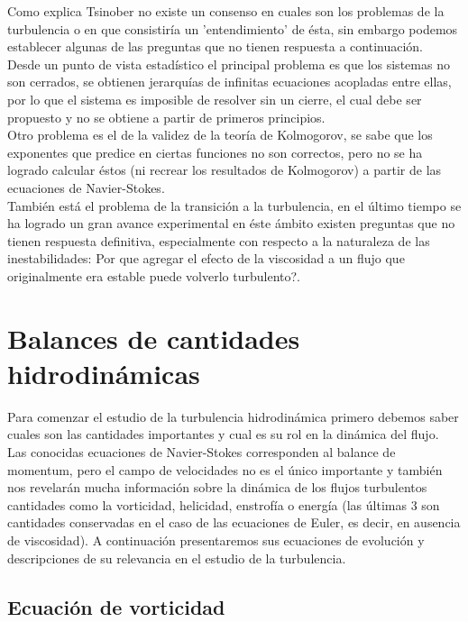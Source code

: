 \documentclass[executivepaper,12pt]{article}
\numberwithin{equation}{section}
\begin{document}
Como explica Tsinober \parencite{tsinober2019} no existe un consenso en cuales son los problemas de la turbulencia o en que consistiría un 'entendimiento' de ésta, sin embargo podemos establecer algunas de las preguntas que no tienen respuesta a continuación.\\
Desde un punto de vista estadístico el principal problema es que los sistemas no son cerrados, se obtienen jerarquías de infinitas ecuaciones \parencite{mccomb2014} acopladas entre ellas, por lo que el sistema es imposible de resolver sin un cierre, el cual debe ser propuesto y no se obtiene a partir de primeros principios.\\
Otro problema es el de la validez de la teoría de Kolmogorov, se sabe que los exponentes que predice en ciertas funciones no son correctos, pero no se ha logrado calcular éstos (ni recrear los resultados de Kolmogorov) a partir de las ecuaciones de Navier-Stokes. \\
También está el problema de la transición a la turbulencia, en el último tiempo se ha logrado un gran avance experimental en éste ámbito \parencite{avila2011} existen preguntas que no tienen respuesta definitiva, especialmente con respecto a la naturaleza de las inestabilidades: Por que agregar el efecto de la viscosidad a un flujo que originalmente era estable puede volverlo turbulento?.  


\pagebreak
\section{Balances de cantidades hidrodinámicas}

Para comenzar el estudio de la turbulencia hidrodinámica primero debemos saber cuales son las cantidades importantes y cual es su rol en la dinámica del flujo. Las conocidas ecuaciones de Navier-Stokes corresponden al balance de momentum, pero el campo de velocidades no es el único importante y también nos revelarán mucha información sobre la dinámica de los flujos turbulentos cantidades como la vorticidad, helicidad, enstrofía o energía (las últimas 3 son cantidades conservadas en el caso de las ecuaciones de Euler, es decir, en ausencia de viscosidad).  A continuación presentaremos sus ecuaciones de evolución y descripciones de su relevancia en el estudio de la turbulencia. 


\subsection{Ecuación de vorticidad}
\end{document}
